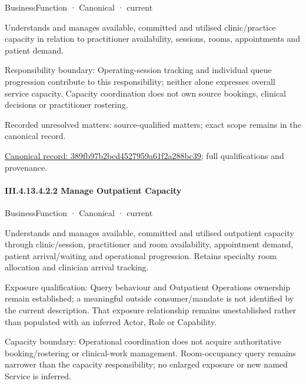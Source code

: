 \label{element:389fb97b2bcd4527959a61f2a288bc39}
{\small BusinessFunction · Canonical · current}\par

Understands and manages available, committed and utilised clinic/practice capacity in relation to practitioner availability, sessions, rooms, appointments and patient demand.



Responsibility boundary: Operating-session tracking and individual queue progression contribute to this responsibility; neither alone expresses overall service capacity. Capacity coordination does not own source bookings, clinical decisions or practitioner rostering.


{\small Recorded unresolved matters: source-qualified matters; exact scope remains in the canonical record.}\par
{\footnotesize \href{../../../../continuum/business/business-function/389fb97b2bcd4527959a61f2a288bc39.md}{Canonical record: 389fb97b2bcd4527959a61f2a288bc39}; full qualifications and provenance.}\par
\paragraph*{III.4.13.4.2.2 Manage Outpatient Capacity}
\label{navigation:III.4.13.4.2.2}

\label{element:45fd6190b7334f838575881725f6a66b}
{\small BusinessFunction · Canonical · current}\par

Understands and manages available, committed and utilised outpatient capacity through clinic/session, practitioner and room availability, appointment demand, patient arrival/waiting and operational progression. Retains specialty room allocation and clinician arrival tracking.



Exposure qualification: Query behaviour and Outpatient Operations ownership remain established; a meaningful outside consumer/mandate is not identified by the current description. That exposure relationship remains unestablished rather than populated with an inferred Actor, Role or Capability.



Capacity boundary: Operational coordination does not acquire authoritative booking/rostering or clinical-work management. Room-occupancy query remains narrower than the capacity responsibility; no enlarged exposure or new named Service is inferred.


